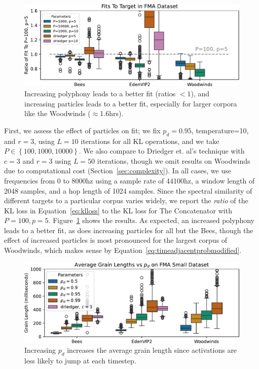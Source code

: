 \documentclass{article}
\begin{document}
\begin{figure}
    \centering
    \includegraphics[width=\columnwidth]{figs/FMAFit.pdf}
    \caption{Increasing polyphony leads to a better fit (ratios $<1$), and increasing particles leads to a better fit, especially for larger corpora like the Woodwinds ($\approx$1.6hrs).}
    \label{fig:fmafit}
\end{figure}

First, we assess the effect of particles on fit; we fix $p_d=0.95$, temperature=10, and $r=3$, using $L=10$ iterations for all KL operations, and we take $P \in \left\{ 100, 1000, 10000 \right\}$.  We also compare to Driedger et. al's technique with $c=3$ and $r=3$ using $L=50$ iterations, though we omit results on Woodwinds due to computational cost (Section~\ref{sec:complexity}).  In all cases, we use frequencies from $0$ to $8000$hz using a sample rate of 44100hz, a window length of 2048 samples, and a hop length of 1024 samples.  Since the spectral similarity of different targets to a particular corpus varies widely, we report the {\em ratio} of the KL loss in Equation~\ref{eq:klloss} to the KL loss for The Concatenator with $P=100, p=5$.  Figure~\ref{fig:fmafit} shows the results.  As expected, an increased polyphony leads to a better fit, as does increasing particles for all but the Bees, though the effect of increased particles is most pronounced for the largest corpus of Woodwinds, which makes sense by Equation~\ref{eq:timeadjacentprobmodified}.


\begin{figure}
    \centering
    \includegraphics[width=\columnwidth]{figs/pdGrainLengths.pdf}
    \caption{Increasing $p_d$ increases the average grain length since activations are less likely to jump at each timestep.}
    \label{fig:pdGrainLengths}
\end{figure}
\end{document}
